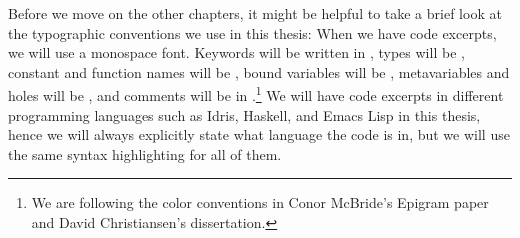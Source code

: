 Before we move on the other chapters, it might be helpful to take a brief look
at the typographic conventions we use in this thesis: When we have code
excerpts, we will use a monospace font.  Keywords will be written in , types will be , constant and function names will be
, bound variables will be , metavariables and holes
will be \texttt{}, and comments will be in
.\footnote{We are following the color conventions in Conor McBride's
Epigram paper\cite{epigram} and David Christiansen's
dissertation\cite{davidphd}.} We will have code excerpts in different
programming languages such as Idris, Haskell, and Emacs Lisp in this thesis,
hence we will always explicitly state what language the code is in, but we will
use the same syntax highlighting for all of them.
